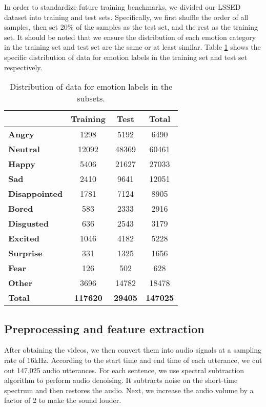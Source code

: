 \documentclass{article}
\begin{document}
In order to standardize future training benchmarks, we divided our LSSED dataset into training and test sets.
Specifically, we first shuffle the order of all samples, then set 20\% of the samples as the test set, and the rest as the training set.
It should be noted that we ensure the distribution of each emotion category in the training set and test set are the same or at least similar.
Table \ref{tab:dis_class} shows the specific distribution of data for emotion labels in the training set and test set respectively.

\begin{table}[htbp]
  \caption{Distribution of data for emotion labels in the subsets.}
  \label{tab:dis_class}
\centering
  \begin{tabular}{ lcc|c }
    \hline
    \textbf{} & \textbf{Training} & \textbf{Test} & \textbf{Total}\\
    \hline
    \textbf{Angry}          &   1298    &   5192    & 6490 \\
    \textbf{Neutral}        &   12092   &   48369   & 60461 \\
    \textbf{Happy}          &  5406     &   21627   &  27033   \\
    \textbf{Sad}            &  2410     &   9641    &  12051   \\
    \textbf{Disappointed}   &  1781     &   7124    & 8905    \\
    \textbf{Bored}          & 583       &   2333    & 2916    \\
    \textbf{Disgusted}      &  636      &   2543    &  3179   \\
    \textbf{Excited}        &  1046     &   4182    &  5228   \\
    \textbf{Surprise}       &  331      &   1325    &  1656   \\
    \textbf{Fear}           &  126      &   502     & 628    \\
    \textbf{Other}          &  3696     &   14782   & 18478    \\
    \hline
    \textbf{Total}  &   \textbf{117620} &   \textbf{29405} &   \textbf{147025}  \\
    \hline
    \end{tabular}
\end{table}


\subsection{Preprocessing and feature extraction}
After obtaining the videos, we then convert them into audio signals at a sampling rate of 16kHz.
According to the start time and end time of each utterance, we cut out 147,025 audio utterances.
For each sentence, we use spectral subtraction algorithm \cite{upadhyay2015speech} to perform audio denoising. It subtracts noise on the short-time spectrum and then restores the audio.
Next, we increase the audio volume by a factor of 2 to make the sound louder.
\end{document}
